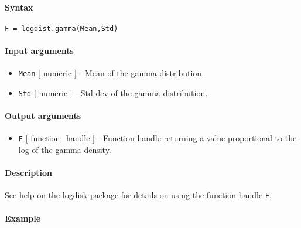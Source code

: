 


	\paragraph{Syntax}

\begin{verbatim}
F = logdist.gamma(Mean,Std)
\end{verbatim}

\paragraph{Input arguments}

\begin{itemize}
\item
  \texttt{Mean} {[} numeric {]} - Mean of the gamma distribution.
\item
  \texttt{Std} {[} numeric {]} - Std dev of the gamma distribution.
\end{itemize}

\paragraph{Output arguments}

\begin{itemize}
\itemsep1pt\parskip0pt
\item
  \texttt{F} {[} function\_handle {]} - Function handle returning a
  value proportional to the log of the gamma density.
\end{itemize}

\paragraph{Description}

See \href{logdist/Contents}{help on the logdisk package} for details on
using the function handle \texttt{F}.

\paragraph{Example}


